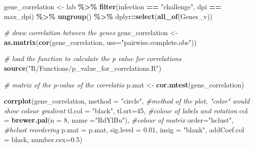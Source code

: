 \documentclass[
]{article}
\newenvironment{Shaded}{\begin{snugshade}}{\end{snugshade}}
\newcommand{\AttributeTok}[1]{\textcolor[rgb]{0.13,0.29,0.53}{#1}}
\newcommand{\CommentTok}[1]{\textcolor[rgb]{0.56,0.35,0.01}{\textit{#1}}}
\newcommand{\DecValTok}[1]{\textcolor[rgb]{0.00,0.00,0.81}{#1}}
\newcommand{\FloatTok}[1]{\textcolor[rgb]{0.00,0.00,0.81}{#1}}
\newcommand{\FunctionTok}[1]{\textcolor[rgb]{0.13,0.29,0.53}{\textbf{#1}}}
\newcommand{\NormalTok}[1]{#1}
\newcommand{\OtherTok}[1]{\textcolor[rgb]{0.56,0.35,0.01}{#1}}
\newcommand{\SpecialCharTok}[1]{\textcolor[rgb]{0.81,0.36,0.00}{\textbf{#1}}}
\newcommand{\StringTok}[1]{\textcolor[rgb]{0.31,0.60,0.02}{#1}}
\begin{document}
\begin{Shaded}
\begin{Highlighting}[]
\NormalTok{gene\_correlation }\OtherTok{\textless{}{-}}\NormalTok{ lab }\SpecialCharTok{\%\textgreater{}\%} 
  \FunctionTok{filter}\NormalTok{(infection }\SpecialCharTok{==} \StringTok{"challenge"}\NormalTok{, dpi }\SpecialCharTok{==}\NormalTok{ max\_dpi) }\SpecialCharTok{\%\textgreater{}\%}
  \FunctionTok{ungroup}\NormalTok{() }\SpecialCharTok{\%\textgreater{}\%}
\NormalTok{  dplyr}\SpecialCharTok{::}\FunctionTok{select}\NormalTok{(}\FunctionTok{all\_of}\NormalTok{(Genes\_v))}

\CommentTok{\# draw correlation between the genes}
\NormalTok{gene\_correlation }\OtherTok{\textless{}{-}} \FunctionTok{as.matrix}\NormalTok{(}\FunctionTok{cor}\NormalTok{(gene\_correlation, }
                                  \AttributeTok{use=}\StringTok{"pairwise.complete.obs"}\NormalTok{))}

\CommentTok{\# load the function to calculate the p value for correlations}
\FunctionTok{source}\NormalTok{(}\StringTok{"R/Functions/p\_value\_for\_correlations.R"}\NormalTok{)}

\CommentTok{\# matrix of the p{-}value of the correlatio}
\NormalTok{p.mat }\OtherTok{\textless{}{-}} \FunctionTok{cor.mtest}\NormalTok{(gene\_correlation)}

\FunctionTok{corrplot}\NormalTok{(gene\_correlation, }
         \AttributeTok{method =} \StringTok{"circle"}\NormalTok{,  }\CommentTok{\#method of the plot, "color" would show colour gradient}
         \AttributeTok{tl.col =} \StringTok{"black"}\NormalTok{, }\AttributeTok{tl.srt=}\DecValTok{45}\NormalTok{, }\CommentTok{\#colour of labels and rotation}
         \AttributeTok{col =} \FunctionTok{brewer.pal}\NormalTok{(}\AttributeTok{n =} \DecValTok{8}\NormalTok{, }\AttributeTok{name =}\StringTok{"RdYlBu"}\NormalTok{), }\CommentTok{\#colour of matrix}
         \AttributeTok{order=}\StringTok{"hclust"}\NormalTok{, }\CommentTok{\#hclust reordering}
         \AttributeTok{p.mat =}\NormalTok{ p.mat, }\AttributeTok{sig.level =} \FloatTok{0.01}\NormalTok{, }\AttributeTok{insig =} \StringTok{"blank"}\NormalTok{,}
         \AttributeTok{addCoef.col =} \StringTok{\textquotesingle{}black\textquotesingle{}}\NormalTok{,}
         \AttributeTok{number.cex=}\FloatTok{0.5}\NormalTok{) }
\end{Highlighting}
\end{Shaded}
\end{document}
